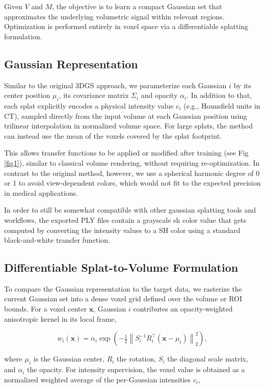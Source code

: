 \documentclass[runningheads]{llncs}
\begin{document}
Given $V$ and $M$, the objective is to learn a compact Gaussian set that approximates the underlying volumetric signal within relevant regions. Optimization is performed entirely in voxel space via a differentiable splatting formulation.




\subsection{Gaussian Representation}
Similar to the original 3DGS approach, we parameterize each Gaussian $i$ by its center position $\mu_i$, its covariance matrix $\Sigma_i$ and opacity $\alpha_i$. In addition to that, each splat explicitly encodes a physical intensity value $c_i$ (e.g., Hounsfield units in CT), sampled directly from the input volume at each Gaussian position using trilinear interpolation in normalized volume space. For large splats, the method can instead use the mean of the voxels covered by the splat footprint.

This allows transfer functions to be applied or modified after training (see Fig \ref{fig1}), similar to classical volume rendering, without requiring re-optimization. In contrast to the original method, however, we use a spherical harmonic degree of 0 or 1 to avoid view-dependent colors, which would not fit to the expected precision in medical applications.

In order to still be somewhat compatible with other gaussian splatting tools and workflows, the exported PLY files contain a grayscale sh color value that gets computed by converting the intensity values to a SH color using a standard black-and-white transfer function.


\subsection{Differentiable Splat-to-Volume Formulation}
To compare the Gaussian representation to the target data, we rasterize the current Gaussian set into a dense voxel grid defined over the volume or ROI bounds. For a voxel center $\mathbf{x}$, Gaussian $i$ contributes an opacity-weighted anisotropic kernel in its local frame,

\begin{equation}
w_i(\mathbf{x}) = \alpha_i \exp\left(-\tfrac{1}{2}\left\|S_i^{-1} R_i^\top (\mathbf{x}-\mu_i)\right\|_2^2\right),
\end{equation}

where $\mu_i$ is the Gaussian center, $R_i$ the rotation, $S_i$ the diagonal scale matrix, and $\alpha_i$ the opacity. For intensity supervision, the voxel value is obtained as a normalized weighted average of the per-Gaussian intensities $c_i$,
\end{document}
